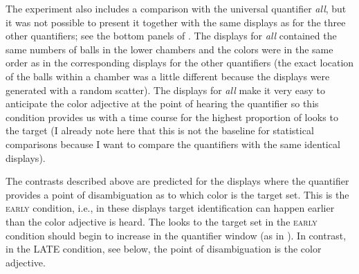 \documentclass[output=paper]{langscibook}
\begin{document}


The experiment also includes a comparison with the universal quantifier \textit{all}, but it was not possible to present it together with the same displays as for the three other quantifiers; see the bottom panels of . The displays for \textit{all} contained the same numbers of balls in the lower chambers and the colors were in the same order as in the corresponding displays for the other quantifiers (the exact location of the balls within a chamber was a little different because the displays were generated with a random scatter). The displays for \textit{all} make it very easy to anticipate the color adjective at the point of hearing the quantifier so this condition provides us with a time course for the highest proportion of looks to the target (I already note here that this is not the baseline for statistical comparisons because I want to compare the quantifiers with the same identical displays).

The contrasts described above are predicted for the displays where the quantifier provides a point of disambiguation as to which color is the target set. This is the \textsc{early} condition, i.e., in these displays target identification can happen earlier
than the color adjective is heard. The looks to the target set in the \textsc{early} condition should begin to increase in the quantifier window (as in \citealt{degen2016availability}). In contrast, in the LATE condition, see  below, the point of disambiguation is the color adjective.
\end{document}
